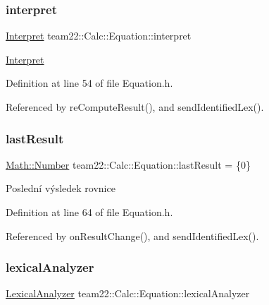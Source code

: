 \subsubsection{\texorpdfstring{interpret}{interpret}}
{\footnotesize\ttfamily \hyperlink{classteam22_1_1_calc_1_1_interpret}{Interpret} team22\+::\+Calc\+::\+Equation\+::interpret\hspace{0.3cm}{\ttfamily [private]}}

\hyperlink{classteam22_1_1_calc_1_1_interpret}{Interpret} 

Definition at line 54 of file Equation.\+h.



Referenced by re\+Compute\+Result(), and send\+Identified\+Lex().

\mbox{\label{classteam22_1_1_calc_1_1_equation_a7c62440412a33b3b3300e63ff65ffafb}} 
\subsubsection{\texorpdfstring{last\+Result}{lastResult}}
{\footnotesize\ttfamily \hyperlink{classteam22_1_1_math_1_1_number}{Math\+::\+Number} team22\+::\+Calc\+::\+Equation\+::last\+Result = \{0\}\hspace{0.3cm}{\ttfamily [private]}}

Poslední výsledek rovnice 

Definition at line 64 of file Equation.\+h.



Referenced by on\+Result\+Change(), and send\+Identified\+Lex().

\mbox{\label{classteam22_1_1_calc_1_1_equation_a65aeaa2a279994b03517a22addf31fc1}} 
\subsubsection{\texorpdfstring{lexical\+Analyzer}{lexicalAnalyzer}}
{\footnotesize\ttfamily \hyperlink{classteam22_1_1_calc_1_1_lexical_analyzer}{Lexical\+Analyzer} team22\+::\+Calc\+::\+Equation\+::lexical\+Analyzer\hspace{0.3cm}{\ttfamily [private]}}

